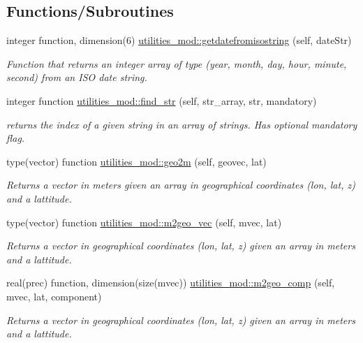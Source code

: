 \subsection*{Functions/\+Subroutines}
\begin{DoxyCompactItemize}
\item 
integer function, dimension(6) \mbox{\hyperlink{namespaceutilities__mod_ab5b97f243f9347a40db76d55509d37ca}{utilities\+\_\+mod\+::getdatefromisostring}} (self, date\+Str)
\begin{DoxyCompactList}\small\item\em Function that returns an integer array of type (year, month, day, hour, minute, second) from an I\+SO date string. \end{DoxyCompactList}\item 
integer function \mbox{\hyperlink{namespaceutilities__mod_ad446cce78a6509db0e839439a0e84564}{utilities\+\_\+mod\+::find\+\_\+str}} (self, str\+\_\+array, str, mandatory)
\begin{DoxyCompactList}\small\item\em returns the index of a given string in an array of strings. Has optional mandatory flag. \end{DoxyCompactList}\item 
type(vector) function \mbox{\hyperlink{namespaceutilities__mod_ad6e463f7e5fc49fe4fcd5464326ade01}{utilities\+\_\+mod\+::geo2m}} (self, geovec, lat)
\begin{DoxyCompactList}\small\item\em Returns a vector in meters given an array in geographical coordinates (lon, lat, z) and a lattitude. \end{DoxyCompactList}\item 
type(vector) function \mbox{\hyperlink{namespaceutilities__mod_a70b21b18c8633b7fd4c3057530d3f16f}{utilities\+\_\+mod\+::m2geo\+\_\+vec}} (self, mvec, lat)
\begin{DoxyCompactList}\small\item\em Returns a vector in geographical coordinates (lon, lat, z) given an array in meters and a lattitude. \end{DoxyCompactList}\item 
real(prec) function, dimension(size(mvec)) \mbox{\hyperlink{namespaceutilities__mod_ae6b8a45b229e3f1f8c2b12dd74e7a2dd}{utilities\+\_\+mod\+::m2geo\+\_\+comp}} (self, mvec, lat, component)
\begin{DoxyCompactList}\small\item\em Returns a vector in geographical coordinates (lon, lat, z) given an array in meters and a lattitude. \end{DoxyCompactList}\item 

\end{DoxyCompactItemize}
